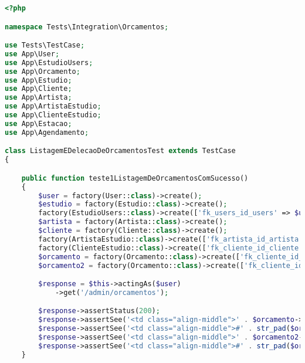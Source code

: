 \begin{lstlisting}[language=PHP, caption= Scripts de teste de Listagem e Deleção de Orçamentos, nolol,
label={code:ListagemEDelecaoDeOrcamentosTest}]
<?php

namespace Tests\Integration\Orcamentos;

use Tests\TestCase;
use App\User;
use App\EstudioUsers;
use App\Orcamento;
use App\Estudio;
use App\Cliente;
use App\Artista;
use App\ArtistaEstudio;
use App\ClienteEstudio;
use App\Estacao;
use App\Agendamento;

class ListagemEDelecaoDeOrcamentosTest extends TestCase
{

    public function teste1ListagemDeOrcamentosComSucesso()
    {
        $user = factory(User::class)->create();
        $estudio = factory(Estudio::class)->create();
        factory(EstudioUsers::class)->create(['fk_users_id_users' => $user->id, 'fk_estudio_id_estudio' => $estudio->id_estudio]);
        $artista = factory(Artista::class)->create();
        $cliente = factory(Cliente::class)->create();
        factory(ArtistaEstudio::class)->create(['fk_artista_id_artista' => $artista->id_artista, 'fk_estudio_id_estudio' => $estudio->id_estudio]);
        factory(ClienteEstudio::class)->create(['fk_cliente_id_cliente' => $cliente->id_cliente, 'fk_estudio_id_estudio' => $estudio->id_estudio]);
        $orcamento = factory(Orcamento::class)->create(['fk_cliente_id_cliente' => $cliente->id_cliente, 'fk_artista_id_artista' => $artista->id_artista, 'fk_estudio_id_estudio' => $estudio->id_estudio, 'fk_orcamento_status_id_orcamento_status' => 1]);
        $orcamento2 = factory(Orcamento::class)->create(['fk_cliente_id_cliente' => $cliente->id_cliente, 'fk_artista_id_artista' => $artista->id_artista, 'fk_estudio_id_estudio' => $estudio->id_estudio, 'fk_orcamento_status_id_orcamento_status' => 1]);

        $response = $this->actingAs($user)
            ->get('/admin/orcamentos');

        $response->assertStatus(200);
        $response->assertSee('<td class="align-middle">' . $orcamento->tatuagem_nome . '</td>', $escaped = false);
        $response->assertSee('<td class="align-middle">#' . str_pad($orcamento->id_orcamento, 5, '0', STR_PAD_LEFT) . '</td>', $escaped = false);
        $response->assertSee('<td class="align-middle">' . $orcamento2->tatuagem_nome . '</td>', $escaped = false);
        $response->assertSee('<td class="align-middle">#' . str_pad($orcamento2->id_orcamento, 5, '0', STR_PAD_LEFT) . '</td>', $escaped = false);
    }


\end{lstlisting}
